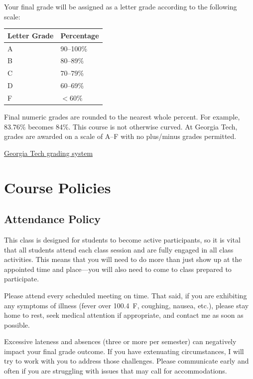\documentclass[11pt]{article}
\begin{document}
Your final grade will be assigned as a letter grade according to the
following scale:

\begin{center}
\renewcommand{\arraystretch}{1.15}
\begin{tabularx}{0.98\textwidth}{X p{}}
\toprule
\textbf{Letter Grade} & \textbf{Percentage} \\
\midrule
A & 90--100\% \\
B & 80--89\% \\
C & 70--79\% \\
D & 60--69\% \\
F & $<60\%$ \\
\bottomrule
\end{tabularx}
\renewcommand{\arraystretch}{1.0}
\end{center}

Final numeric grades are rounded to the nearest whole percent. For example, 83.76\% becomes 84\%. This course is not otherwise curved. At Georgia Tech, grades are awarded on a scale of A--F with no plus/minus grades permitted.

\href{http://registrar.gatech.edu/info/grading-system}{Georgia Tech grading system}

\section*{Course Policies}

\subsection*{Attendance Policy}

This class is designed for students to become active participants, so
it is vital that all students attend each class session and are fully
engaged in all class activities. This means that you will need to do
more than just show up at the appointed time and place---you will also
need to come to class prepared to participate.

Please attend every scheduled meeting on time. That said, if you are
exhibiting any symptoms of illness (fever over 100.4~F, coughing,
nausea, etc.), please stay home to rest, seek medical attention if
appropriate, and contact me as soon as possible.

Excessive lateness and absences (three or more per semester) can
negatively impact your final grade outcome. If you have extenuating
circumstances, I will try to work with you to address those challenges.
Please communicate early and often if you are struggling with issues
that may call for accommodations.
\end{document}
